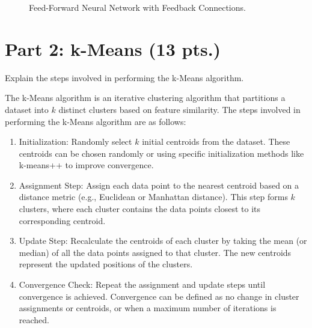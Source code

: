 \documentclass[12pt]{article}
\begin{document}
\begin{ejercicio}
\begin{figure}
            \caption{Feed-Forward Neural Network with Feedback Connections.}
            \label{fig:ffnn}
        \end{figure}
    \end{ejercicio}

    \newpage

    \section*{Part 2: k-Means (13 pts.)}

    \begin{ejercicio}
        Explain the steps involved in performing the k-Means algorithm.

        The k-Means algorithm is an iterative clustering algorithm that partitions a dataset into $k$ distinct clusters based on feature similarity. The steps involved in performing the k-Means algorithm are as follows:
        \begin{enumerate}
            \item Initialization: Randomly select $k$ initial centroids from the dataset. These centroids can be chosen randomly or using specific initialization methods like k-means++ to improve convergence.
            \item Assignment Step: Assign each data point to the nearest centroid based on a distance metric (e.g., Euclidean or Manhattan distance). This step forms $k$ clusters, where each cluster contains the data points closest to its corresponding centroid.
            \item Update Step: Recalculate the centroids of each cluster by taking the mean (or median) of all the data points assigned to that cluster. The new centroids represent the updated positions of the clusters.
            \item Convergence Check: Repeat the assignment and update steps until convergence is achieved. Convergence can be defined as no change in cluster assignments or centroids, or when a maximum number of iterations is reached.
        \end{enumerate}
    \end{ejercicio}
\end{document}
